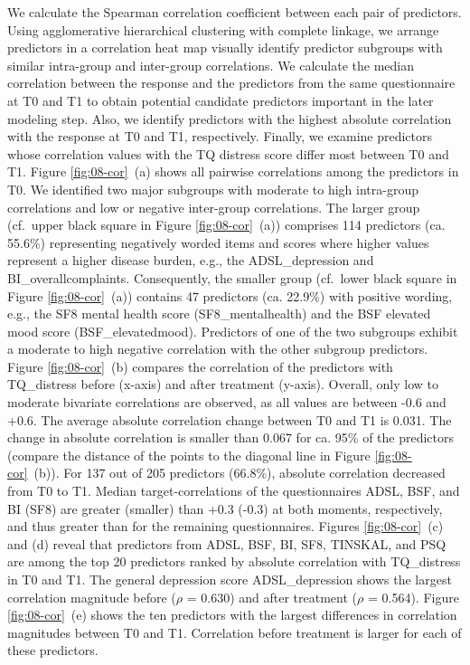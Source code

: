 \documentclass[
  oneside]{book}
\begin{document}
We calculate the Spearman correlation coefficient between each pair of predictors.
Using agglomerative hierarchical clustering with complete linkage, we arrange predictors in a correlation heat map visually identify predictor subgroups with similar intra-group and inter-group correlations.
We calculate the median correlation between the response and the predictors from the same questionnaire at T0 and T1 to obtain potential candidate predictors important in the later modeling step.
Also, we identify predictors with the highest absolute correlation with the response at T0 and T1, respectively.
Finally, we examine predictors whose correlation values with the TQ distress score differ most between T0 and T1.
Figure \ref{fig:08-cor}~(a) shows all pairwise correlations among the predictors in T0.
We identified two major subgroups with moderate to high intra-group correlations and low or negative inter-group correlations.
The larger group (cf.~upper black square in Figure \ref{fig:08-cor}~(a)) comprises 114 predictors (ca. 55.6\%) representing negatively worded items and scores where higher values represent a higher disease burden, e.g., the ADSL\_depression and BI\_overallcomplaints.
Consequently, the smaller group (cf.~lower black square in Figure \ref{fig:08-cor}~(a)) contains 47 predictors (ca. 22.9\%) with positive wording, e.g., the SF8 mental health score (SF8\_mentalhealth) and the BSF elevated mood score (BSF\_elevatedmood).
Predictors of one of the two subgroups exhibit a moderate to high negative correlation with the other subgroup predictors.
Figure \ref{fig:08-cor}~(b) compares the correlation of the predictors with TQ\_distress before (x-axis) and after treatment (y-axis).
Overall, only low to moderate bivariate correlations are observed, as all values are between -0.6 and +0.6.
The average absolute correlation change between T0 and T1 is 0.031.
The change in absolute correlation is smaller than 0.067 for ca. 95\% of the predictors (compare the distance of the points to the diagonal line in Figure \ref{fig:08-cor}~(b)).
For 137 out of 205 predictors (66.8\%), absolute correlation decreased from T0 to T1.
Median target-correlations of the questionnaires ADSL, BSF, and BI (SF8) are greater (smaller) than +0.3 (-0.3) at both moments, respectively, and thus greater than for the remaining questionnaires.
Figures \ref{fig:08-cor}~(c) and (d) reveal that predictors from ADSL, BSF, BI, SF8, TINSKAL, and PSQ are among the top 20 predictors ranked by absolute correlation with TQ\_distress in T0 and T1.
The general depression score ADSL\_depression shows the largest correlation magnitude before (\(\rho\) = 0.630) and after treatment (\(\rho\) = 0.564).
Figure \ref{fig:08-cor}~(e) shows the ten predictors with the largest differences in correlation magnitudes between T0 and T1.
Correlation before treatment is larger for each of these predictors.
\end{document}

